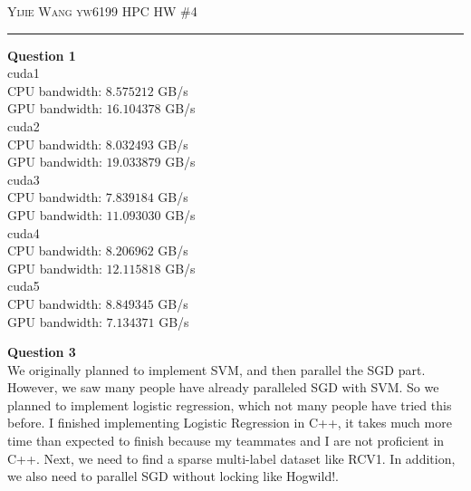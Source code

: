 \documentclass[12pt]{amsart}
\begin{document}
\thispagestyle{empty}

{\scshape Yijie Wang yw6199} \hfill {\scshape \large HPC} \hfill {HW \#4\scshape }
 

\hrule
\smallskip
\vskip0.2cm

\textbf{Question 1} \\
cuda1\\ 
CPU bandwidth:    $8.575212$ GB/s \\
GPU bandwidth:    $16.104378$ GB/s \\
cuda2\\ 
CPU bandwidth:    $8.032493$ GB/s \\
GPU bandwidth:    $19.033879$ GB/s \\
cuda3\\ 
CPU bandwidth:    $7.839184$ GB/s \\
GPU bandwidth:    $11.093030$ GB/s \\
cuda4\\ 
CPU bandwidth:    $8.206962$ GB/s \\
GPU bandwidth:    $12.115818$ GB/s \\
cuda5\\ 
CPU bandwidth:    $8.849345$ GB/s \\
GPU bandwidth:    $7.134371$ GB/s \\
\break

\textbf{Question 3} \\
We originally planned to implement SVM, and then parallel the SGD part. However, we saw many people have already paralleled SGD with SVM. So we planned to implement logistic regression, which not many people have tried this before. I finished implementing Logistic Regression in C++, it takes much more time than expected to finish because my teammates and I are not proficient in C++. Next, we need to find a sparse multi-label dataset like RCV1. In addition, we also need to parallel SGD without locking like Hogwild!. 
\end{document}
